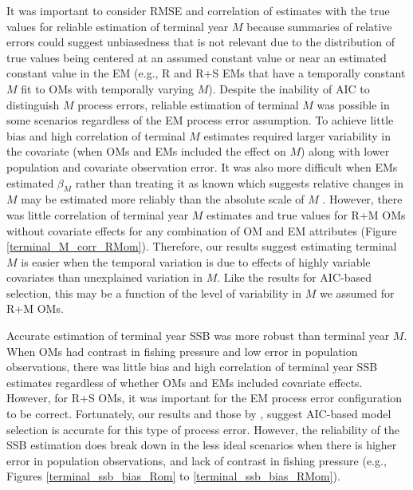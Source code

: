 \documentclass[
  12pt,
]{article}
\begin{document}
It was important to consider RMSE and correlation of estimates with the
true values for reliable estimation of terminal year \(M\) because
summaries of relative errors could suggest unbiasedness that is not
relevant due to the distribution of true values being centered at an
assumed constant value or near an estimated constant value in the EM
(e.g., R and R+S EMs that have a temporally constant \(M\) fit to OMs
with temporally varying \(M\)). Despite the inability of AIC to
distinguish \(M\) process errors, reliable estimation of terminal \(M\)
was possible in some scenarios regardless of the EM process error
assumption. To achieve little bias and high correlation of terminal
\(M\) estimates required larger variability in the covariate (when OMs
and EMs included the effect on \(M\)) along with lower population and
covariate observation error. It was also more difficult when EMs
estimated \(\beta_M\) rather than treating it as known which suggests
relative changes in \(M\) may be estimated more reliably than the
absolute scale of \(M\) \citep[c.f.,][]{zhangetal20}. However, there was
little correlation of terminal year \(M\) estimates and true values for
R+M OMs without covariate effects for any combination of OM and EM
attributes (Figure \ref{terminal_M_corr_RMom}). Therefore, our results
suggest estimating terminal \(M\) is easier when the temporal variation
is due to effects of highly variable covariates than unexplained
variation in \(M\). Like the results for AIC-based selection, this may
be a function of the level of variability in \(M\) we assumed for R+M
OMs.

Accurate estimation of terminal year SSB was more robust than terminal
year \(M\). When OMs had contrast in fishing pressure and low error in
population observations, there was little bias and high correlation of
terminal year SSB estimates regardless of whether OMs and EMs included
covariate effects. However, for R+S OMs, it was important for the EM
process error configuration to be correct. Fortunately, our results and
those by \citet{milleretal26}, suggest AIC-based model selection is
accurate for this type of process error. However, the reliability of the
SSB estimation does break down in the less ideal scenarios when there is
higher error in population observations, and lack of contrast in fishing
pressure (e.g., Figures \ref{terminal_ssb_bias_Rom} to
\ref{terminal_ssb_bias_RMom}).
\end{document}
